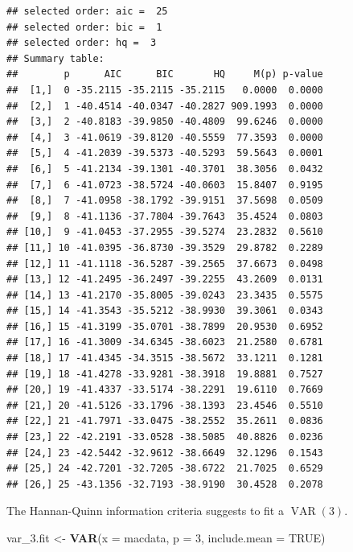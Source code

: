 \documentclass[12pt,a4paper]{article}
\newcommand{\VAR}{\operatorname{VAR}} %
\newenvironment{Shaded}{\begin{snugshade}}{\end{snugshade}}
\newcommand{\DataTypeTok}[1]{\textcolor[rgb]{0.13,0.29,0.53}{#1}}
\newcommand{\DecValTok}[1]{\textcolor[rgb]{0.00,0.00,0.81}{#1}}
\newcommand{\FloatTok}[1]{\textcolor[rgb]{0.00,0.00,0.81}{#1}}
\newcommand{\KeywordTok}[1]{\textcolor[rgb]{0.13,0.29,0.53}{\textbf{#1}}}
\newcommand{\NormalTok}[1]{#1}
\newcommand{\OtherTok}[1]{\textcolor[rgb]{0.56,0.35,0.01}{#1}}
\newcommand{\StringTok}[1]{\textcolor[rgb]{0.31,0.60,0.02}{#1}}
\begin{document}
\begin{verbatim}
## selected order: aic =  25 
## selected order: bic =  1 
## selected order: hq =  3 
## Summary table:  
##        p      AIC      BIC       HQ     M(p) p-value
##  [1,]  0 -35.2115 -35.2115 -35.2115   0.0000  0.0000
##  [2,]  1 -40.4514 -40.0347 -40.2827 909.1993  0.0000
##  [3,]  2 -40.8183 -39.9850 -40.4809  99.6246  0.0000
##  [4,]  3 -41.0619 -39.8120 -40.5559  77.3593  0.0000
##  [5,]  4 -41.2039 -39.5373 -40.5293  59.5643  0.0001
##  [6,]  5 -41.2134 -39.1301 -40.3701  38.3056  0.0432
##  [7,]  6 -41.0723 -38.5724 -40.0603  15.8407  0.9195
##  [8,]  7 -41.0958 -38.1792 -39.9151  37.5698  0.0509
##  [9,]  8 -41.1136 -37.7804 -39.7643  35.4524  0.0803
## [10,]  9 -41.0453 -37.2955 -39.5274  23.2832  0.5610
## [11,] 10 -41.0395 -36.8730 -39.3529  29.8782  0.2289
## [12,] 11 -41.1118 -36.5287 -39.2565  37.6673  0.0498
## [13,] 12 -41.2495 -36.2497 -39.2255  43.2609  0.0131
## [14,] 13 -41.2170 -35.8005 -39.0243  23.3435  0.5575
## [15,] 14 -41.3543 -35.5212 -38.9930  39.3061  0.0343
## [16,] 15 -41.3199 -35.0701 -38.7899  20.9530  0.6952
## [17,] 16 -41.3009 -34.6345 -38.6023  21.2580  0.6781
## [18,] 17 -41.4345 -34.3515 -38.5672  33.1211  0.1281
## [19,] 18 -41.4278 -33.9281 -38.3918  19.8881  0.7527
## [20,] 19 -41.4337 -33.5174 -38.2291  19.6110  0.7669
## [21,] 20 -41.5126 -33.1796 -38.1393  23.4546  0.5510
## [22,] 21 -41.7971 -33.0475 -38.2552  35.2611  0.0836
## [23,] 22 -42.2191 -33.0528 -38.5085  40.8826  0.0236
## [24,] 23 -42.5442 -32.9612 -38.6649  32.1296  0.1543
## [25,] 24 -42.7201 -32.7205 -38.6722  21.7025  0.6529
## [26,] 25 -43.1356 -32.7193 -38.9190  30.4528  0.2078
\end{verbatim}

The Hannan-Quinn information criteria suggests to fit a \(\VAR(3)\).

\begin{Shaded}
\begin{Highlighting}[]
\NormalTok{var_}\FloatTok{3.}\NormalTok{fit <-}\StringTok{ }\KeywordTok{VAR}\NormalTok{(}\DataTypeTok{x =}\NormalTok{ macdata, }\DataTypeTok{p =} \DecValTok{3}\NormalTok{, }\DataTypeTok{include.mean =} \OtherTok{TRUE}\NormalTok{)}
\end{Highlighting}
\end{Shaded}
\end{document}
